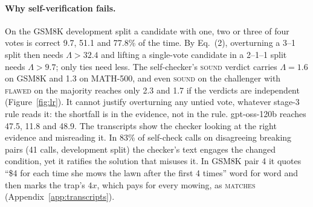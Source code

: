 \documentclass[letterpaper]{article} %
\begin{document}
\paragraph{Why self-verification fails.}
On the GSM8K development split a candidate with one, two or three of four votes is correct 9.7, 51.1 and 77.8\% of the time. By Eq.~(2), overturning a 3--1 split then needs $\Lambda > 32.4$ and lifting a single-vote candidate in a 2--1--1 split needs $\Lambda > 9.7$; only ties need less. The self-checker's \textsc{sound} verdict carries $\Lambda = 1.6$ on GSM8K and 1.3 on MATH-500, and even \textsc{sound} on the challenger with \textsc{flawed} on the majority reaches only 2.3 and 1.7 if the verdicts are independent (Figure~\ref{fig:lr}). It cannot justify overturning any untied vote, whatever stage-3 rule reads it: the shortfall is in the evidence, not in the rule. gpt-oss-120b reaches 47.5, 11.8 and 48.9. The transcripts show the checker looking at the right evidence and misreading it. In 83\% of self-check calls on disagreeing breaking pairs (41 calls, development split) the checker's text engages the changed condition, yet it ratifies the solution that misuses it. In GSM8K pair 4 it quotes ``\$4 for each time she mows the lawn after the first 4 times'' word for word and then marks the trap's $4x$, which pays for every mowing, as \textsc{matches} (Appendix~\ref{app:transcripts}).
\end{document}
